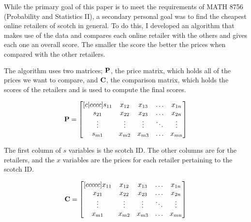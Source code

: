 While the primary goal of this paper is to meet the requirements of MATH 8756 (Probability and Statistics II), a secondary personal goal was to find the cheapest online retailers of scotch in general. To do this, I developed an algorithm that makes use of the data and compares each online retailer with the others and gives each one an overall score. The smaller the score the better the prices when compared with the other retailers.

The algorithm uses two matrices; $\mathbf{P}$, the price matrix, which holds all of the prices we want to compare, and $\mathbf{C}$, the comparison matrix, which holds the scores of the retailers and is used to compute the final scores.

\begin{equation*}
\begin{split}
    \mathbf{P} &= 
    \begin{bmatrix}[c | c c c c]
    s_{11}       & x_{12} & x_{13} & \dots & x_{1n} \\
    s_{21}       & x_{22} & x_{23} & \dots & x_{2n} \\
    \vdots       & \vdots & \vdots & \ddots & \vdots \\
    s_{m1}       & x_{m2} & x_{m3} & \dots & x_{mn}
    \end{bmatrix}\\
\end{split}
\end{equation*}

The first column of $s$ variables is the scotch ID. The other columns are for the retailers, and the $x$ variables are the prices for each retailer pertaining to the scotch ID.


\begin{equation*}
\begin{split}
    \mathbf{C} &= 
    \begin{bmatrix}[c c c c c]
    x_{11} & x_{12} & x_{13} & \dots & x_{1n} \\
    x_{21} & x_{22} & x_{23} & \dots & x_{2n} \\ \vdots & \vdots & \vdots & \ddots & \vdots \\
    x_{m1} & x_{m2} & x_{m3} & \dots & x_{mn}
    \end{bmatrix}\\
\end{split}
\end{equation*}


